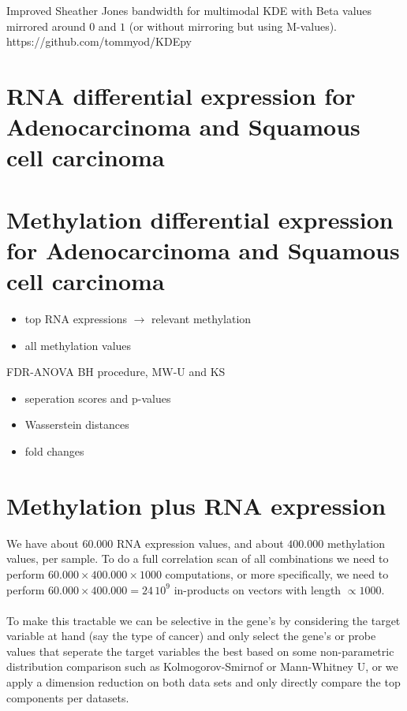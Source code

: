 \documentclass[a4paper,10pt]{article}
\begin{document}
Improved Sheather Jones bandwidth for multimodal KDE with Beta values mirrored around $0$ 
and $1$ (or without mirroring but using M-values). https://github.com/tommyod/KDEpy

\section{RNA differential expression for Adenocarcinoma and Squamous cell carcinoma}
%

\section{Methylation differential expression for Adenocarcinoma and Squamous cell carcinoma}
%
\begin{itemize}
 \item top RNA expressions $\rightarrow$ relevant methylation
 \item all methylation values
\end{itemize}
%
FDR-ANOVA BH procedure, MW-U and KS 

\begin{itemize}
 \item seperation scores and p-values
 \item Wasserstein distances
 \item fold changes
\end{itemize}


\section{Methylation plus RNA expression}
%
We have about $60.000$ RNA expression values, and about $400.000$ methylation values, per sample.
To do a full correlation scan of all combinations we need to perform $60.000\times 400.000 \times 1000$ computations, 
or more specifically, we need to perform $60.000\times 400.000=24\,10^9$ in-products on vectors with length $\propto 1000$. \\ \\
%
To make this tractable we can be selective in the gene's by considering the target variable at hand (say the type 
of cancer) and only select the gene's or probe values that seperate the target variables the best based 
on some non-parametric distribution comparison such as Kolmogorov-Smirnof or Mann-Whitney U, or we apply 
a dimension reduction on both data sets and only directly compare  the top components per datasets.
\end{document}
